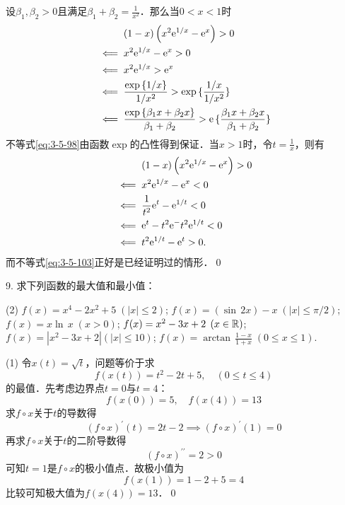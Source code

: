 \prove 设$\beta_1, \beta_2 > 0$且满足$\beta_1 + \beta_2 = \displaystyle\frac{1}{x^2}$．那么当$0 < x < 1$时
\begin{align}
    &\mathrel{\phantom{\impliedby}} \left(1-x\right)\left(x^2 \mathrm{e}^{1/x} - \mathrm{e}^x\right) > 0  \\
    &\impliedby x^2 \mathrm{e}^{1/x} - \mathrm{e}^{x} > 0 \\
    &\impliedby x^2 \mathrm{e}^{1/x} > \mathrm{e}^{x} \\
    &\impliedby \frac{\exp \, \{ 1/x \}}{1/x^2} > \exp \, \{ \frac{1/x}{1/x^2} \} \\
    &\impliedby \frac{\exp \, \{ \beta_1 x + \beta_2 x\}}{\beta_1 + \beta_2} > \mathrm{e} \, \{ \frac{\beta_1 x + \beta_2 x}{\beta_1 + \beta_2} \} \label{eq:3-5-98}
\end{align}
不等式\ref{eq:3-5-98}由函数$\exp$的凸性得到保证．当$x > 1$时，令$t = \displaystyle\frac{1}{x}$，则有
\begin{align}
    &\mathrel{\phantom{\impliedby}} \left(1-x\right)\left(x^2 \mathrm{e}^{1/x} - \mathrm{e}^x\right) > 0  \\
    &\impliedby x^2 \mathrm{e}^{1/x} - \mathrm{e}^{x} < 0 \\
    &\impliedby \frac{1}{t^2} \mathrm{e}^t - \mathrm{e}^{1/t} < 0 \\
    &\impliedby \mathrm{e}^t - t^2 \mathrm{e}^ - t^2 \mathrm{e}^{1/t} < 0 \\
    &\impliedby t^2 \mathrm{e}^{1/t} - \mathrm{e}^t > 0. \label{eq:3-5-103}
\end{align}
而不等式\ref{eq:3-5-103}正好是已经证明过的情形．\qed\bigskip

9. 求下列函数的最大值和最小值：
\begin{tasks}(2)
    \task $f(x) = x^4 - 2x^2 + 5 \; (\left| x \right| \leq 2)$; 
    \task $f(x) = \left(\sin \, 2x\right) - x \; \left( \left| x \right| \leq \pi / 2\right)$;
    \task $f(x) = x \ln \, x \; \left(x > 0\right)$;
    \task $f(x) = x^2 - 3x + 2 \; \left(x \in \mathbb{R}\right)$;
    \task $f(x) = \left| x^2 - 3x + 2 \right| \left(\left| x \right| \leq 10\right)$;
    \task $f(x) = \arctan \, \displaystyle\frac{1-x}{1+x} \; \left(0 \leq x \leq 1\right)$.
\end{tasks}

(1) \solve 令$x(t)=\sqrt{t}$，问题等价于求
\begin{equation}
    f(x(t)) = t^2 - 2t + 5, \quad \left(0 \leq t \leq 4\right)
\end{equation}
的最值．先考虑边界点$t = 0$与$t=4$：
\begin{equation}
    f(x(0)) = 5, \quad f(x(4)) = 13
\end{equation}
求$f \circ x$关于$t$的导数得
\begin{equation}
    \left(f \circ x\right)^{\prime} (t) = 2t - 2 \implies \left(f \circ x\right)^{\prime} (1) = 0
\end{equation}
再求$f \circ x$关于$t$的二阶导数得
\begin{equation}
    \left(f \circ x\right)^{\prime\prime} = 2 > 0
\end{equation}
可知$t = 1$是$f \circ x$的极小值点．故极小值为
\begin{equation}
    f(x(1)) = 1 - 2 + 5 = 4
\end{equation}
比较可知极大值为$f(x(4))=13$．\qed\bigskip

